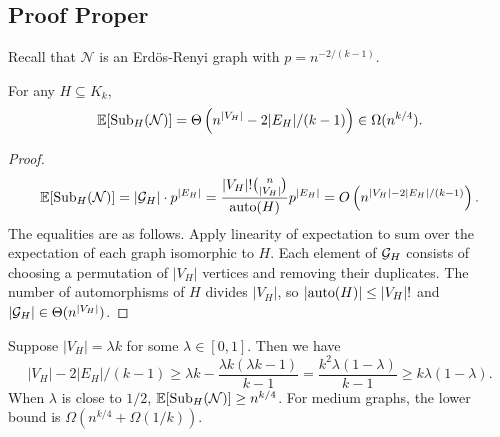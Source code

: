 \documentclass[11pt]{article}
\begin{document}
	\subsection{Proof Proper}
	Recall that $\mathcal{N}$ is an Erd\"{o}s-Renyi graph with $p = n^{-2/(k-1)}$. 
	\begin{lemma}
		\label{lem:E-NumSubgraphsInNIsomorphicToH}
		For any $H \subseteq K_k$,
		\[\operatorname{\mathbb{E}}[\mathrm{Sub}_{H}(\mathcal{N})] = \Theta\left(n^{|V_H|} - 2|E_H|/(k-1)\right) \in \Omega(n^{k/4}).\]
	\end{lemma}
	\begin{proof}
		\[\operatorname{\mathbb{E}}[\mathrm{Sub}_{H}(\mathcal{N})] = |\mathcal{G}_{H}| \cdot p^{|E_H|} = \frac{|V_H|!\binom{n}{|V_H|}}{\mathrm{auto}(H)}p^{|E_H|} = O\left(n^{|V_H| - 2|E_H|/(k-1)}\right).\]
		The equalities are as follows. Apply linearity of expectation to sum over the expectation of each graph isomorphic to $H$. Each element of $\mathcal{G}_H$ consists of choosing a permutation of $|V_H|$ vertices and removing their duplicates. The number of automorphisms of $H$ divides $|V_H|$, so $|\mathrm{auto}(H)| \leq |V_H|!$ and $|\mathcal{G}_H| \in \Theta(n^{|V_H|})$.   
	\end{proof}
	Suppose $|V_H| = \lambda k$ for some $\lambda \in [0,1]$. Then we have 
	\[|V_H| - 2|E_H|/(k-1) \geq \lambda k - \frac{\lambda k(\lambda k - 1)}{k-1} = \frac{k^2\lambda (1 - \lambda)}{k-1} \geq k\lambda(1 - \lambda).\]
	When $\lambda$ is close to $1/2$, $\operatorname{\mathbb{E}}[\mathrm{Sub}_{H}(\mathcal{N})] \geq n^{k/4}$. For medium graphs, the lower bound is $\Omega(n^{k/4} + \Omega(1/k))$. 
	
\end{document}
